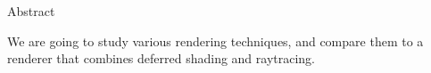 
Abstract

We are going to study various rendering techniques, and compare them to a renderer that combines deferred shading and raytracing.


